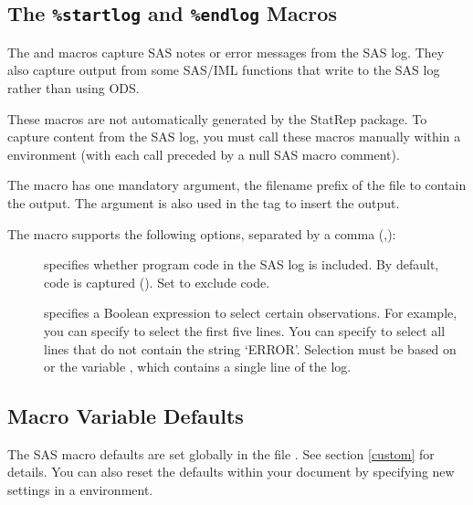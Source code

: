 \documentclass[article,oneside]{memoir}
\newcommand*{\StatRep}{\textsf{StatRep}\xspace}
\begin{document}
 \subsection{The \texttt{\%startlog} and \texttt{\%endlog} Macros}\label{startlog}

  The  and  macros capture SAS notes
  or error messages from the SAS log. They also capture output
  from some SAS/IML functions that write to the SAS log rather than using ODS.

  These macros are not automatically generated by the \StatRep package.
  To capture content from the SAS log, you must call these macros
  manually within a  environment (with each call preceded
  by a null SAS macro comment).

  The  macro has one mandatory argument, the filename prefix
  of the file to contain the output. The argument is also used in the 
  tag to insert the output.

  The  macro supports the following options,
  separated by a comma (,):

  \begin{description}
  \item[] specifies whether program code in the SAS log is included.
  By default, code is captured (). Set  to exclude code.
  \item[] specifies a Boolean expression to select
  certain observations. For example, you can specify 
  to select the first five lines.  You can specify
   to select all lines that do not contain the string
  `ERROR'. Selection must be based on  or the variable , which
  contains a single line of the log.
  \end{description}

  \subsection{Macro Variable Defaults}\label{secdefaults}

  The SAS macro defaults are set globally in the file .
  See section \ref{custom} for details. You can also reset the
  defaults within your document by specifying new settings in a 
  environment.
\end{document}
